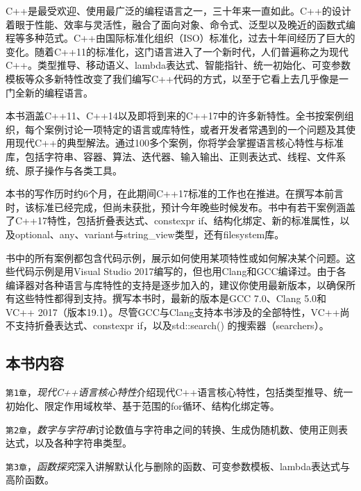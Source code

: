 
C++是最受欢迎、使用最广泛的编程语言之一，三十年来一直如此。C++的设计着眼于性能、效率与灵活性，融合了面向对象、命令式、泛型以及晚近的函数式编程等多种范式。C++由国际标准化组织（ISO）标准化，过去十年间经历了巨大的变化。随着C++11的标准化，这门语言进入了一个新时代，人们普遍称之为现代C++。类型推导、移动语义、lambda表达式、智能指针、统一初始化、可变参数模板等众多新特性改变了我们编写C++代码的方式，以至于它看上去几乎像是一门全新的编程语言。



本书涵盖C++11、C++14以及即将到来的C++17中的许多新特性。全书按案例组织，每个案例讨论一项特定的语言或库特性，或者开发者常遇到的一个问题及其使用现代C++的典型解法。通过100多个案例，你将学会掌握语言核心特性与标准库，包括字符串、容器、算法、迭代器、输入输出、正则表达式、线程、文件系统、原子操作与各类工具。



本书的写作历时约6个月，在此期间C++17标准的工作也在推进。在撰写本前言时，该标准已经完成，但尚未获批，预计今年晚些时候发布。书中有若干案例涵盖了C++17特性，包括折叠表达式、constexpr if、结构化绑定、新的标准属性，以及optional、any、variant与string\_view类型，还有filesystem库。



书中的所有案例都包含代码示例，展示如何使用某项特性或如何解决某个问题。这些代码示例是用Visual Studio 2017编写的，但也用Clang和GCC编译过。由于各编译器对各种语言与库特性的支持是逐步加入的，建议你使用最新版本，以确保所有这些特性都得到支持。撰写本书时，最新的版本是GCC 7.0、Clang 5.0和VC++ 2017（版本19.1）。尽管GCC与Clang支持本书涉及的全部特性，VC++尚不支持折叠表达式、constexpr if，以及std::search() 的搜索器（searchers）。



\subsection*{本书内容}



\texttt{第1章}，\textit{现代C++语言核心特性}介绍现代C++语言核心特性，包括类型推导、统一初始化、限定作用域枚举、基于范围的for循环、结构化绑定等。



\texttt{第2章}，\textit{数字与字符串}讨论数值与字符串之间的转换、生成伪随机数、使用正则表达式，以及各种字符串类型。



\texttt{第3章}，\textit{函数探究}深入讲解默认化与删除的函数、可变参数模板、lambda表达式与高阶函数。


